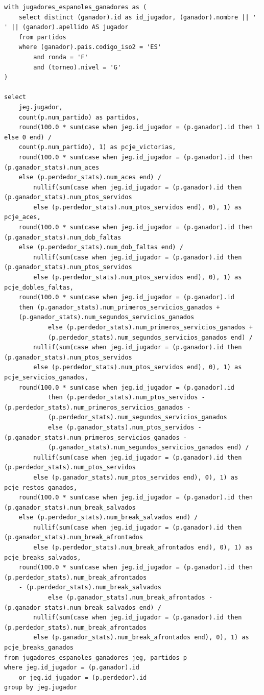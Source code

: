 \begin{verbatim}
with jugadores_espanoles_ganadores as (
    select distinct (ganador).id as id_jugador, (ganador).nombre || ' ' || (ganador).apellido AS jugador
    from partidos
    where (ganador).pais.codigo_iso2 = 'ES'
        and ronda = 'F'
        and (torneo).nivel = 'G'
)

select
    jeg.jugador,
    count(p.num_partido) as partidos,
    round(100.0 * sum(case when jeg.id_jugador = (p.ganador).id then 1 else 0 end) / 
	count(p.num_partido), 1) as pcje_victorias,
    round(100.0 * sum(case when jeg.id_jugador = (p.ganador).id then (p.ganador_stats).num_aces 
	else (p.perdedor_stats).num_aces end) /
        nullif(sum(case when jeg.id_jugador = (p.ganador).id then (p.ganador_stats).num_ptos_servidos 
		else (p.perdedor_stats).num_ptos_servidos end), 0), 1) as pcje_aces,
    round(100.0 * sum(case when jeg.id_jugador = (p.ganador).id then (p.ganador_stats).num_dob_faltas 
	else (p.perdedor_stats).num_dob_faltas end) /
        nullif(sum(case when jeg.id_jugador = (p.ganador).id then (p.ganador_stats).num_ptos_servidos 
		else (p.perdedor_stats).num_ptos_servidos end), 0), 1) as pcje_dobles_faltas,
    round(100.0 * sum(case when jeg.id_jugador = (p.ganador).id 
	then (p.ganador_stats).num_primeros_servicios_ganados + 
	(p.ganador_stats).num_segundos_servicios_ganados
            else (p.perdedor_stats).num_primeros_servicios_ganados + 
			(p.perdedor_stats).num_segundos_servicios_ganados end) /
        nullif(sum(case when jeg.id_jugador = (p.ganador).id then (p.ganador_stats).num_ptos_servidos 
		else (p.perdedor_stats).num_ptos_servidos end), 0), 1) as pcje_servicios_ganados,
    round(100.0 * sum(case when jeg.id_jugador = (p.ganador).id
            then (p.perdedor_stats).num_ptos_servidos - (p.perdedor_stats).num_primeros_servicios_ganados - 
			(p.perdedor_stats).num_segundos_servicios_ganados
            else (p.ganador_stats).num_ptos_servidos - (p.ganador_stats).num_primeros_servicios_ganados - 
			(p.ganador_stats).num_segundos_servicios_ganados end) /
        nullif(sum(case when jeg.id_jugador = (p.ganador).id then (p.perdedor_stats).num_ptos_servidos 
		else (p.ganador_stats).num_ptos_servidos end), 0), 1) as pcje_restos_ganados,
    round(100.0 * sum(case when jeg.id_jugador = (p.ganador).id then (p.ganador_stats).num_break_salvados 
	else (p.perdedor_stats).num_break_salvados end) /
        nullif(sum(case when jeg.id_jugador = (p.ganador).id then (p.ganador_stats).num_break_afrontados 
		else (p.perdedor_stats).num_break_afrontados end), 0), 1) as pcje_breaks_salvados,
    round(100.0 * sum(case when jeg.id_jugador = (p.ganador).id then (p.perdedor_stats).num_break_afrontados 
	- (p.perdedor_stats).num_break_salvados
            else (p.ganador_stats).num_break_afrontados - (p.ganador_stats).num_break_salvados end) /
        nullif(sum(case when jeg.id_jugador = (p.ganador).id then (p.perdedor_stats).num_break_afrontados 
		else (p.ganador_stats).num_break_afrontados end), 0), 1) as pcje_breaks_ganados
from jugadores_espanoles_ganadores jeg, partidos p
where jeg.id_jugador = (p.ganador).id
    or jeg.id_jugador = (p.perdedor).id
group by jeg.jugador
\end{verbatim}

